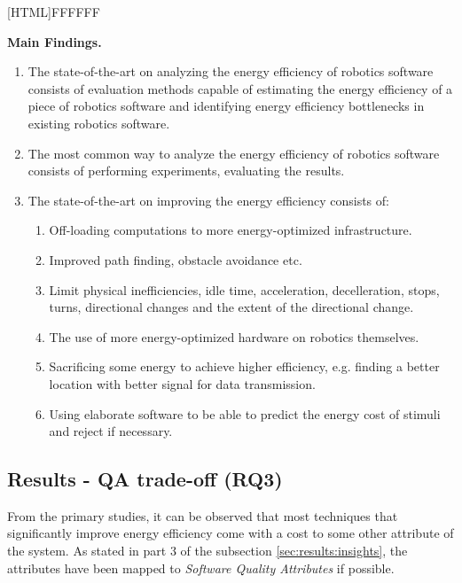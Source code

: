 \noindent{}[HTML]{FFFFFF}{\parbox{0.47\textwidth}{%
\noindent \textbf{Main Findings.}
\begin{enumerate}[nolistsep]
\item The state-of-the-art on analyzing the energy efficiency of robotics software consists of evaluation methods capable of
estimating the energy efficiency of a piece of robotics software and identifying energy efficiency bottlenecks in existing robotics software.
\item The most common way to analyze the energy efficiency of robotics software consists of performing experiments, evaluating the results.
\item The state-of-the-art on improving the energy efficiency consists of:
    \begin{enumerate}
        \item Off-loading computations to more energy-optimized infrastructure.
        \item Improved path finding, obstacle avoidance etc.
        \item Limit physical inefficiencies, idle time, acceleration, decelleration, stops, turns, directional changes and the extent of the directional change.
        \item The use of more energy-optimized hardware on robotics themselves.
        \item Sacrificing some energy to achieve higher efficiency, e.g. finding a better location with better signal for data transmission.
        \item Using elaborate software to be able to predict the energy cost of stimuli and reject if necessary.
    \end{enumerate}
\end{enumerate}}}


\subsection{Results - QA trade-off (RQ3)}
\label{sec:results:rq3_trade_off}
From the primary studies, it can be observed that most techniques that significantly improve energy efficiency come with a cost to some other attribute of the system.
As stated in part 3 of the subsection \ref{sec:results:insights}, the attributes have been mapped to \textit{Software Quality Attributes\cite{iso2011quality_attributes}}
if possible.

